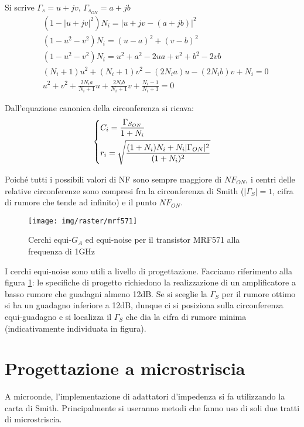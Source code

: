 Si scrive $\Gamma_s = u+jv$, $\Gamma_{s_{ON}} = a+jb$
\begin{align*}
& (1-|u+jv|^2)N_i =|u+jv-(a+jb)|^2\\
& (1-u^2-v^2) N_i = (u-a)^2+(v-b)^2\\
& (1-u^2-v^2 ) N_i = u^2 +a^2 -2ua +v^2 +b^2-2vb\\
& (N_i+1) u^2 + (N_i+1)v^2
-(2N_ia) u -(2N_ib) v + N_i = 0\\
& u^2 + v^2 + \frac{2N_ia}{N_i+1}u
+ \frac{2N_ib}{N_i+1}v + \frac{N_i -1}{N_i+1}=0
\end{align*}


Dall'equazione canonica della circonferenza si ricava:
\begin{equation}
\begin{dcases}
C_i = \frac{\Gamma_{S_{ON}}}{1+N_i}\\
r_i = \sqrt{\frac{(1+N_i)N_i + N_i|\Gamma_{ON}|^2}{(1+N_i)^2}}
\end{dcases}
\end{equation}

Poiché tutti i possibili valori di NF sono sempre maggiore di $NF_{ON}$, i centri delle relative circonferenze sono compresi fra la circonferenza di Smith ($|\Gamma_S|=1$, cifra di rumore che tende ad infinito) e il punto $NF_{ON}$.

\begin{figure}[hbt]
	\centering
	\texttt{[image: img/raster/mrf571]}
	\caption{Cerchi equi-$G_A$ ed equi-noise per il transistor MRF571 alla frequenza di 1GHz}
	\label{fig:equinoise-datasheet}
\end{figure}

I cerchi equi-noise sono utili a livello di progettazione. Facciamo riferimento alla figura \ref{fig:equinoise-datasheet}: le specifiche di progetto richiedono la realizzazione di un amplificatore a basso rumore che guadagni almeno 12dB. Se si sceglie la $\Gamma_S$ per il rumore ottimo si ha un guadagno inferiore a 12dB, dunque ci si posiziona sulla circonferenza equi-guadagno e si localizza il $\Gamma_S$ che dia la cifra di rumore minima (indicativamente individuata in figura).


\section{Progettazione a microstriscia}
A microonde, l'implementazione di adattatori d'impedenza si fa utilizzando la carta di Smith. Principalmente si useranno metodi che fanno uso di soli due tratti di microstriscia.

